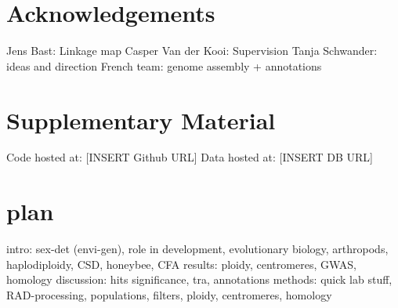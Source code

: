 \documentclass[11pt,a4paper]{report}
\begin{document}
\section*{Acknowledgements}
Jens Bast: Linkage map
Casper Van der Kooi: Supervision
Tanja Schwander: ideas and direction
French team: genome assembly + annotations
\section*{Supplementary Material}

Code  hosted at: [INSERT Github URL]
Data  hosted at: [INSERT DB URL]

\section*{plan}
intro: sex-det (envi-gen), role in development, evolutionary biology, arthropods, haplodiploidy, CSD, honeybee, CFA
results:  ploidy, centromeres, GWAS, homology
discussion: hits significance, tra, annotations
methods: quick lab stuff, RAD-processing, populations, filters, ploidy, centromeres, homology


\fancyhead[L]{\slshape }

\end{document}
